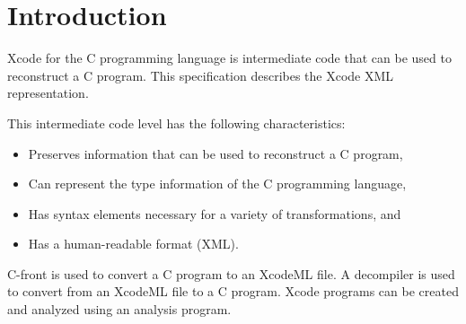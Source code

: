 \section{Introduction}

Xcode for the C programming language is intermediate code that can be used to reconstruct a C program. This specification describes the Xcode XML representation.

This intermediate code level has the following characteristics:

\begin{itemize}
\item Preserves information that can be used to reconstruct a C program,
\item Can represent the type information of the C programming language, 
\item Has syntax elements necessary for a variety of transformations, and
\item Has a human-readable format (XML).
\end{itemize}

C-front is used to convert a C program to an XcodeML file. A decompiler is used to convert from an XcodeML file to a C program. Xcode programs can be created and analyzed using an analysis program.

